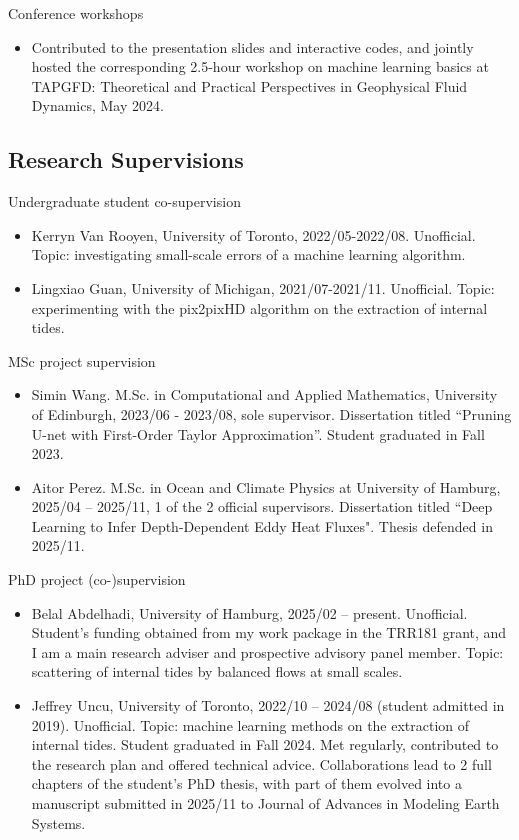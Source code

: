 \documentclass[a4paper,12pt]{article}
\begin{document}
Conference workshops
\begin{itemize}[leftmargin=*,noitemsep]
\item Contributed to the presentation slides and interactive codes, and jointly hosted the corresponding 2.5-hour workshop on machine learning basics at TAPGFD: Theoretical and Practical Perspectives in Geophysical Fluid Dynamics, May 2024.
\end{itemize}
\subsection{Research Supervisions}
Undergraduate student co-supervision
\begin{itemize}[leftmargin=*,noitemsep]
\item Kerryn Van Rooyen, University of Toronto, 2022/05-2022/08. Unofficial. Topic: investigating small-scale errors of a machine learning algorithm.
\item Lingxiao Guan, University of Michigan, 2021/07-2021/11. Unofficial. Topic: experimenting with the pix2pixHD algorithm on the extraction of internal tides.
\end{itemize}
MSc project supervision
\begin{itemize}[leftmargin=*,noitemsep]
\item Simin Wang.   M.Sc. in  Computational and Applied Mathematics, University of Edinburgh, 2023/06 - 2023/08, sole supervisor. Dissertation titled “Pruning U-net with First-Order Taylor Approximation”. Student graduated in Fall 2023.
\item Aitor Perez.  M.Sc.  in Ocean and Climate Physics at University of Hamburg, 2025/04 –  2025/11, 1 of the 2 official supervisors. Dissertation titled ``Deep Learning to Infer Depth-Dependent Eddy Heat Fluxes". Thesis defended in 2025/11. 
\end{itemize}
PhD project (co-)supervision
\begin{itemize}[leftmargin=*,noitemsep]
\item Belal Abdelhadi, University of Hamburg, 2025/02 – present. Unofficial. Student’s funding obtained from my work package in the TRR181 grant, and I am a main research adviser and prospective advisory panel member. Topic: scattering of internal tides by balanced flows at small scales. 
\item Jeffrey Uncu, University of Toronto, 2022/10 -- 2024/08 (student admitted in 2019). Unofficial. Topic: machine learning methods on the extraction of internal tides.  Student graduated in Fall 2024. Met regularly, contributed to the research plan and offered technical advice. Collaborations lead to 2 full chapters of the student’s PhD thesis, with part of them evolved into a manuscript submitted in 2025/11 to Journal of Advances in Modeling Earth Systems.
\end{itemize}
\end{document}
